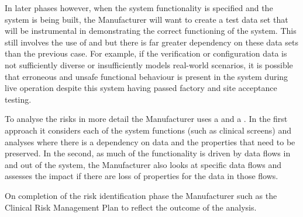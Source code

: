 In later phases however, when the system functionality is specified and the system is being built, the Manufacturer will want to create a test data set that will be instrumental in demonstrating the correct functioning of the system. This still involves the use of  and  but there is far greater dependency on these data sets than the previous case. For example, if the verification or configuration data is not sufficiently diverse or insufficiently models real-world scenarios, it is possible that erroneous and unsafe functional behaviour is present in the system during live operation despite this system having passed factory and site acceptance testing.

To analyse the risks in more detail the Manufacturer uses a  and a . In the first approach it considers each of the system functions (such as clinical screens) and analyses where there is a dependency on data and the properties that need to be preserved. In the second, as much of the functionality is driven by data flows in and out of the system, the Manufacturer also looks at specific data flows and assesses the impact if there are loss of properties for the data in those flows.

On completion of the risk identification phase the Manufacturer  such as the Clinical Risk Management Plan to reflect the outcome of the analysis.

